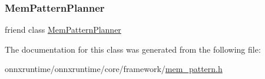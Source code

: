 \subsubsection{\texorpdfstring{Mem\+Pattern\+Planner}{MemPatternPlanner}}
{\footnotesize\ttfamily friend class \mbox{\hyperlink{classonnxruntime_1_1MemPatternPlanner}{Mem\+Pattern\+Planner}}\hspace{0.3cm}{\ttfamily [friend]}}



The documentation for this class was generated from the following file\+:\begin{DoxyCompactItemize}
\item 
onnxruntime/onnxruntime/core/framework/\mbox{\hyperlink{mem__pattern_8h}{mem\+\_\+pattern.\+h}}\end{DoxyCompactItemize}
